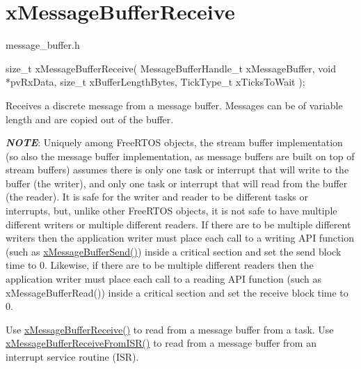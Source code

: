 \hypertarget{group__xMessageBufferReceive}{}\section{x\+Message\+Buffer\+Receive}
\label{group__xMessageBufferReceive}
message\+\_\+buffer.\+h


\begin{DoxyPre}
size\_t xMessageBufferReceive( MessageBufferHandle\_t xMessageBuffer,
                              void *pvRxData,
                              size\_t xBufferLengthBytes,
                              TickType\_t xTicksToWait );
\end{DoxyPre}


Receives a discrete message from a message buffer. Messages can be of variable length and are copied out of the buffer.

{\itshape {\bfseries N\+O\+TE}}\+: Uniquely among Free\+R\+T\+OS objects, the stream buffer implementation (so also the message buffer implementation, as message buffers are built on top of stream buffers) assumes there is only one task or interrupt that will write to the buffer (the writer), and only one task or interrupt that will read from the buffer (the reader). It is safe for the writer and reader to be different tasks or interrupts, but, unlike other Free\+R\+T\+OS objects, it is not safe to have multiple different writers or multiple different readers. If there are to be multiple different writers then the application writer must place each call to a writing A\+PI function (such as \hyperlink{message__buffer_8h_a858f6da6fe24a226c45caf1634ea1605}{x\+Message\+Buffer\+Send()}) inside a critical section and set the send block time to 0. Likewise, if there are to be multiple different readers then the application writer must place each call to a reading A\+PI function (such as x\+Message\+Buffer\+Read()) inside a critical section and set the receive block time to 0.

Use \hyperlink{message__buffer_8h_af12a227ba511a95cbea5aa81c7f3ba12}{x\+Message\+Buffer\+Receive()} to read from a message buffer from a task. Use \hyperlink{message__buffer_8h_adf596c00c44752a3c8c542cc6b5df234}{x\+Message\+Buffer\+Receive\+From\+I\+S\+R()} to read from a message buffer from an interrupt service routine (I\+SR).


